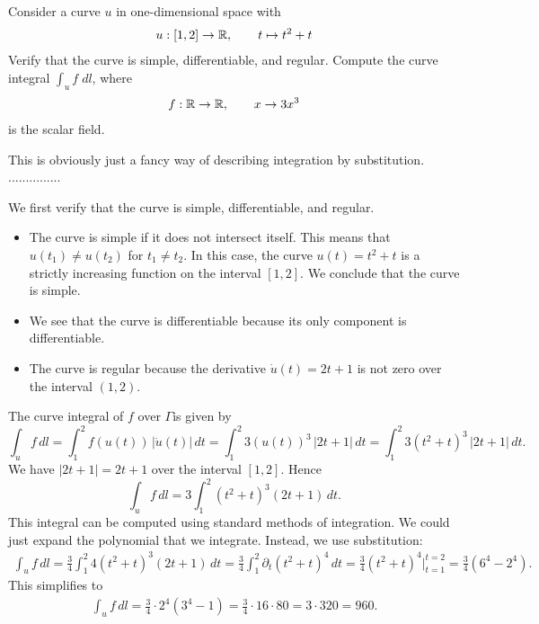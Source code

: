 \documentclass[11pt]{article}
\begin{document}





\begin{exercise}
    Consider a curve $u$ in one-dimensional space with
    \begin{align*}
        u : [1,2] \rightarrow \mathbb{R}, \qquad t \mapsto t^2 + t
    \end{align*}
    Verify that the curve is simple, differentiable, and regular. Compute the curve integral $\int_u f \;dl$, where 
    \begin{align*}
        f : \mathbb{R} \rightarrow \mathbb{R}, \qquad x \rightarrow 3x^3
    \end{align*}
    is the scalar field.
\end{exercise}
\begin{solution}
    This is obviously just a fancy way of describing integration by substitution. 
    ...............
\end{solution}
\begin{solution}
    We first verify that the curve is simple, differentiable, and regular.
    \begin{itemize}
        \item 
        The curve is simple if it does not intersect itself. This means that $u(t_1) \neq u(t_2)$ for $t_1 \neq t_2$. 
        In this case, the curve $u(t) = t^2 + t$ is a strictly increasing function on the interval $[1,2]$.
        We conclude that the curve is simple. 
        \item 
        We see that the curve is differentiable because its only component is differentiable. 
        \item 
        The curve is regular because the derivative $\dot u(t) = 2t + 1$ is not zero over the interval $(1,2)$. 
    \end{itemize}
    The curve integral of $f$ over $\Gamma$is given by
    \[
        \int_u f \, dl = \int_1^2 f(u(t)) \, |\dot u(t)| \, dt 
        = 
        \int_1^2 3(u(t))^3 \, |2t+1| \, dt 
        = 
        \int_1^2 3(t^2 + t)^3 \, |2t+1| \, dt 
        .
    \]
    We have $|2t+1| = 2t+1$ over the interval $[1,2]$. Hence
    \[
        \int_u f \, dl = 3 \int_1^2 (t^2 + t)^3 (2t + 1) \, dt.
    \]
    This integral can be computed using standard methods of integration. 
    We could just expand the polynomial that we integrate. Instead, we use substitution:
    \begin{align}
        \int_u f \, dl 
        = 
        \frac 3 4 \int_1^2 4(t^2 + t)^3 (2t + 1) \, dt
        = 
        \frac 3 4 \int_1^2 \partial_t (t^2 + t)^4 \, dt
        = 
        \frac 3 4 (t^2 + t)^4 |_{t=1}^{t=2}
        = 
        \frac 3 4 \left( 6^4 - 2^4 \right)
        .
    \end{align}
    This simplifies to 
    \begin{align}
        \int_u f \, dl 
        = 
        \frac 3 4 \cdot 2^4 \left( 3^4 - 1 \right) = \frac 3 4 \cdot 16 \cdot 80 = 3 \cdot 320 = 960
        .
    \end{align}
\end{solution}
\end{document}
